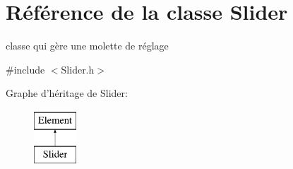 \hypertarget{classSlider}{
\section{Référence de la classe Slider}
\label{classSlider}
}


classe qui gère une molette de réglage  




{\ttfamily \#include $<$Slider.h$>$}

Graphe d'héritage de Slider:\begin{figure}[H]
\begin{center}
\leavevmode
\includegraphics[height=2.000000cm]{classSlider}
\end{center}
\end{figure}
